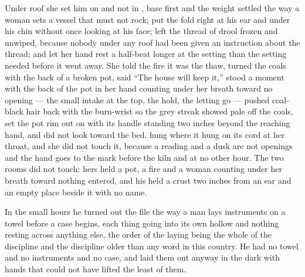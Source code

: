 Under  roof she set him on  and not in , base first and the weight settled the way a woman sets a vessel that must not rock; put the fold right at his ear and under his chin without once looking at his face; left the thread of drool frozen and unwiped, because nobody under any roof had been given an instruction about the thread; and let her hand rest a half-beat longer at the setting than the setting needed before it went away. She told the fire it was the thaw, turned the coals with the back of a broken pot, said “The house will keep it,” stood a moment with the back of the pot in her hand counting under her breath toward no opening --- the small intake at the top, the hold, the letting go --- pushed coal-black hair back with the burn-wrist so the grey streak showed pale off the coals, set the pot rim out on  with its handle standing two inches beyond the reaching hand, and did not look toward the bed.  hung where it hung on its cord at her throat, and she did not touch it, because a reading and a dusk are not openings and the hand goes to the mark before the kiln and at no other hour. The two rooms did not touch: hers held a pot, a fire and a woman counting under her breath toward nothing entered, and his held a crust two inches from an ear and an empty place beside it with no name.

In the small hours he turned out the file the way a man lays instruments on a towel before a case begins, each thing going into its own hollow and nothing resting across anything else, the order of the laying being the whole of the discipline and the discipline older than any word in this country. He had no towel and no instruments and no case, and laid them out anyway in the dark with hands that could not have lifted the least of them.

